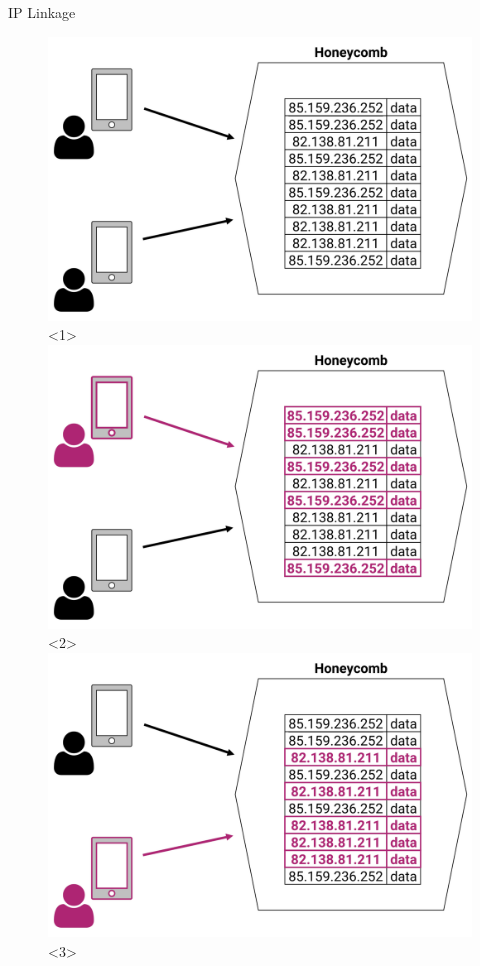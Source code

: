 \begin{frame}{IP Linkage}
    \begin{figure}[<+->]
        \includegraphics[width=\textwidth]{figures/ip}<1>
        \includegraphics[width=\textwidth]{figures/ip1}<2>
        \includegraphics[width=\textwidth]{figures/ip2}<3>
    \end{figure}
\end{frame}

